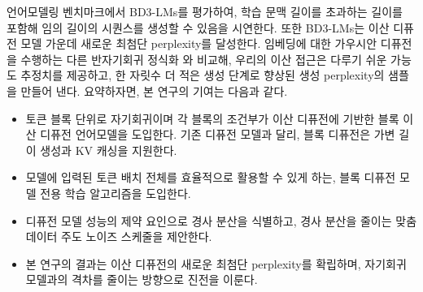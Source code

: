 \documentclass{article} %
\newcommand{\TODO}[1]{\textcolor{red}{[TODO: #1]}}
\def\algofull{Block Discrete Denoising Diffusion Language Models}
\def\algos{BD3-LMs}
\begin{document}
언어모델링 벤치마크에서 \algos{}를 평가하여, 학습 문맥 길이를 초과하는 길이를 포함해 임의 길이의 시퀀스를 생성할 수 있음을 시연한다. 또한 \algos{}는 이산 디퓨전 모델 가운데 새로운 최첨단 perplexity를 달성한다. %
임베딩에 대한 가우시안 디퓨전을 수행하는 다른 반자기회귀 정식화 \citep{han2022ssd,han2023ssd2}와 비교해, 우리의 이산 접근은 다루기 쉬운 가능도 추정치를 제공하고, 한 자릿수 더 적은 생성 단계로 향상된 생성 perplexity의 샘플을 만들어 낸다.
요약하자면, 본 연구의 기여는 다음과 같다.
\begin{itemize}
    \item 토큰 블록 단위로 자기회귀이며 각 블록의 조건부가 이산 디퓨전에 기반한 블록 이산 디퓨전 언어모델을 도입한다. 기존 디퓨전 모델과 달리, 블록 디퓨전은 가변 길이 생성과 KV 캐싱을 지원한다.
    \item 모델에 입력된 토큰 배치 전체를 효율적으로 활용할 수 있게 하는, 블록 디퓨전 모델 전용 학습 알고리즘을 도입한다.
    \item 디퓨전 모델 성능의 제약 요인으로 경사 분산을 식별하고, 경사 분산을 줄이는 맞춤 데이터 주도 노이즈 스케줄을 제안한다.
    \item 본 연구의 결과는 이산 디퓨전의 새로운 최첨단 perplexity를 확립하며, 자기회귀 모델과의 격차를 줄이는 방향으로 진전을 이룬다.
\end{itemize}


\end{document}
